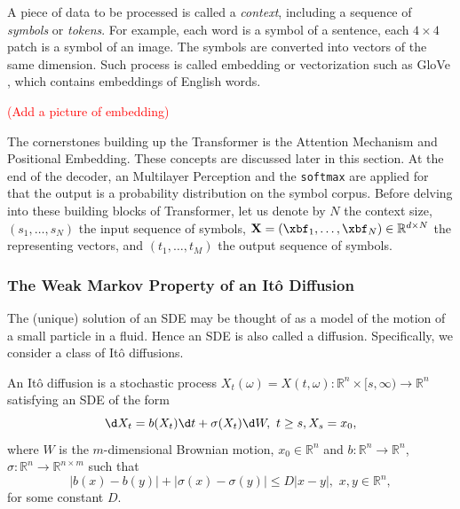 A piece of data to be processed is called a \textit{context}, including a sequence of \textit{symbols} or \textit{tokens}. For example, each word is a symbol of a sentence, each $4\times 4$ patch is a symbol of an image. The symbols are converted into vectors of the same dimension. Such process is called embedding or vectorization such as GloVe \cite{pennington2014glove}, which contains embeddings of English words.

\textcolor{red}{(Add a picture of embedding)}

The cornerstones building up the Transformer is the Attention Mechanism and Positional Embedding. These concepts are discussed later in this section. At the end of the decoder, an Multilayer Perception and the \texttt{softmax} are applied for that the output is a probability distribution on the symbol corpus. Before delving into these building blocks of Transformer, let us denote by $N$ the context size, $(s_1,\ldots,s_N)$ the input sequence of symbols, $\mathbf{X}=(\xbf_1,\ldots,\xbf_N)\in\mathbb{R}^{d\times N}$ the representing vectors, and $(t_1,\ldots,t_M)$ the output sequence of symbols.


\subsubsection{The Weak Markov Property of an Itô Diffusion}
The (unique) solution of an SDE may be thought of as a model of the motion of a small particle in a fluid. Hence an SDE is also called a diffusion. Specifically, we consider a class of Itô diffusions.

\begin{definition}
  An Itô diffusion is a stochastic process $X_t(\omega)=X(t,\omega):\mathbb{R}^n\times[s,\infty)\to\mathbb{R}^n$ satisfying an SDE of the form
  \begin{equation}
    \label{equation:itodiff}
    \d X_t = b(X_t)\d t+\sigma(X_t)\d W,\,\, t\ge s, X_s = x_0,
  \end{equation}
  where $W$ is the $m$-dimensional Brownian motion, $x_0\in\mathbb{R}^n$ and $b:\mathbb{R}^n\to\mathbb{R}^n$, $\sigma:\mathbb{R}^n\to\mathbb{R}^{n\times m}$ such that
  \begin{equation}
    \label{equation:lip}
    |b(x)-b(y)|+|\sigma(x)-\sigma(y)|\le D|x-y|,\,\,x,y\in\mathbb{R}^n,
  \end{equation}
  for some constant $D$.
\end{definition}

